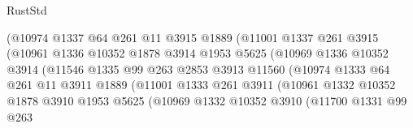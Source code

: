 \begin{lexlean}{RustStd}
\begin{coremodule}
                                (@10974
                                  @1337
                                  @64
                                  @261
                                  @11
                                  @3915
                                  @1889
                                  (@11001
                                    @1337
                                    @261
                                    @3915
                                    (@10961
                                      @1336
                                      @10352
                                      @1878
                                      @3914
                                      @1953
                                      @5625
                                      (@10969
                                        @1336
                                        @10352
                                        @3914
                                        (@11546
                                          @1335
                                          @99
                                          @263
                                          @2853
                                          @3913
                                          @11560
                                          (@10974
                                            @1333
                                            @64
                                            @261
                                            @11
                                            @3911
                                            @1889
                                            (@11001
                                              @1333
                                              @261
                                              @3911
                                              (@10961
                                                @1332
                                                @10352
                                                @1878
                                                @3910
                                                @1953
                                                @5625
                                                (@10969
                                                  @1332
                                                  @10352
                                                  @3910
                                                  (@11700
                                                    @1331
                                                    @99
                                                    @263

\end{coremodule}
\end{lexlean}
